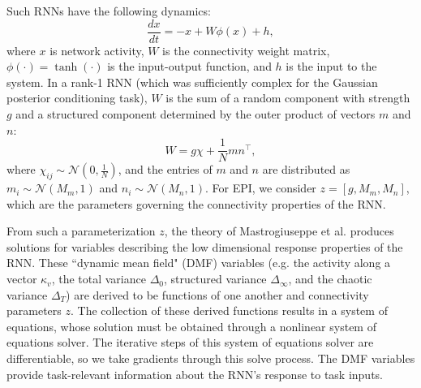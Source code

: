 \documentclass[11pt]{article}
\begin{document}
Such RNNs have the following dynamics: 
\begin{equation}
\frac{dx}{dt} = -x + W \phi(x) + h,
\end{equation}
where $x$ is network activity, $W$ is the connectivity weight matrix, $\phi(\cdot) = \tanh(\cdot)$ is the input-output function, and $h$ is the input to the system.
In a rank-1 RNN (which was sufficiently complex for the Gaussian posterior conditioning task), $W$ is the sum of a random component with strength $g$ and a structured component determined by the outer product of vectors $m$ and $n$:
\begin{equation}
W = g\chi + \frac{1}{N}mn^\top,
\end{equation}
where  $\chi_{ij} \sim \mathcal{N}(0, \frac{1}{N})$, and the entries of $m$ and $n$ are distributed as $m_i \sim \mathcal{N}(M_m, 1)$ and $n_i \sim \mathcal{N}(M_n, 1)$. 
For EPI, we consider $z = [g, M_m, M_n]$, which are the parameters governing the connectivity properties of the RNN.

From such a parameterization $z$, the theory of Mastrogiuseppe et al. produces solutions for variables describing the low dimensional response properties of the RNN.
These ``dynamic mean field" (DMF) variables (e.g. the activity along a vector $\kappa_v$, the total variance $\Delta_0$, structured variance $\Delta_\infty$, and the chaotic variance $\Delta_T$) are derived to be functions of one another and connectivity parameters $z$.
The collection of these derived functions results in a system of equations, whose solution must be obtained through a nonlinear system of equations solver.
The iterative steps of this system of equations solver are differentiable, so we take gradients through this solve process.
The DMF variables provide task-relevant information about the RNN's response to task inputs.
\end{document}
